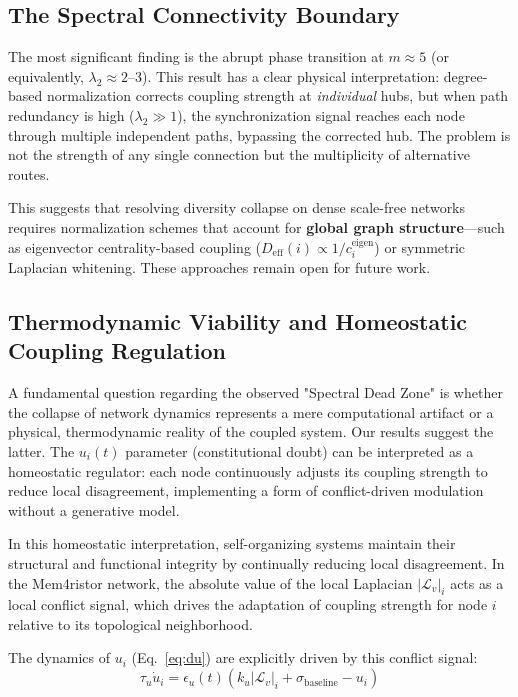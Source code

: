 \documentclass[11pt]{article}
\begin{document}
\subsection{The Spectral Connectivity Boundary}

The most significant finding is the abrupt phase transition at $m \approx 5$ (or equivalently, $\lambda_2 \approx 2$--$3$). This result has a clear physical interpretation: degree-based normalization corrects coupling strength at \emph{individual} hubs, but when path redundancy is high ($\lambda_2 \gg 1$), the synchronization signal reaches each node through multiple independent paths, bypassing the corrected hub. The problem is not the strength of any single connection but the multiplicity of alternative routes.

This suggests that resolving diversity collapse on dense scale-free networks requires normalization schemes that account for \textbf{global graph structure}---such as eigenvector centrality-based coupling ($D_{\text{eff}}(i) \propto 1/c_i^{\text{eigen}}$) or symmetric Laplacian whitening. These approaches remain open for future work.

\subsection{Thermodynamic Viability and Homeostatic Coupling Regulation}

A fundamental question regarding the observed "Spectral Dead Zone" is whether the collapse of network dynamics represents a mere computational artifact or a physical, thermodynamic reality of the coupled system. Our results suggest the latter. The $u_i(t)$ parameter (constitutional doubt) can be interpreted as a homeostatic regulator: each node continuously adjusts its coupling strength to reduce local disagreement, implementing a form of conflict-driven modulation without a generative model.

In this homeostatic interpretation, self-organizing systems maintain their structural and functional integrity by continually reducing local disagreement. In the Mem4ristor network, the absolute value of the local Laplacian $|\mathcal{L}_v|_i$ acts as a local conflict signal, which drives the adaptation of coupling strength for node $i$ relative to its topological neighborhood.

The dynamics of $u_i$ (Eq.~\ref{eq:du}) are explicitly driven by this conflict signal:
\begin{equation*}
\tau_u \dot{u}_i = \epsilon_u(t) \left( k_u |\mathcal{L}_v|_i + \sigma_{\text{baseline}} - u_i \right)
\end{equation*}
\end{document}
